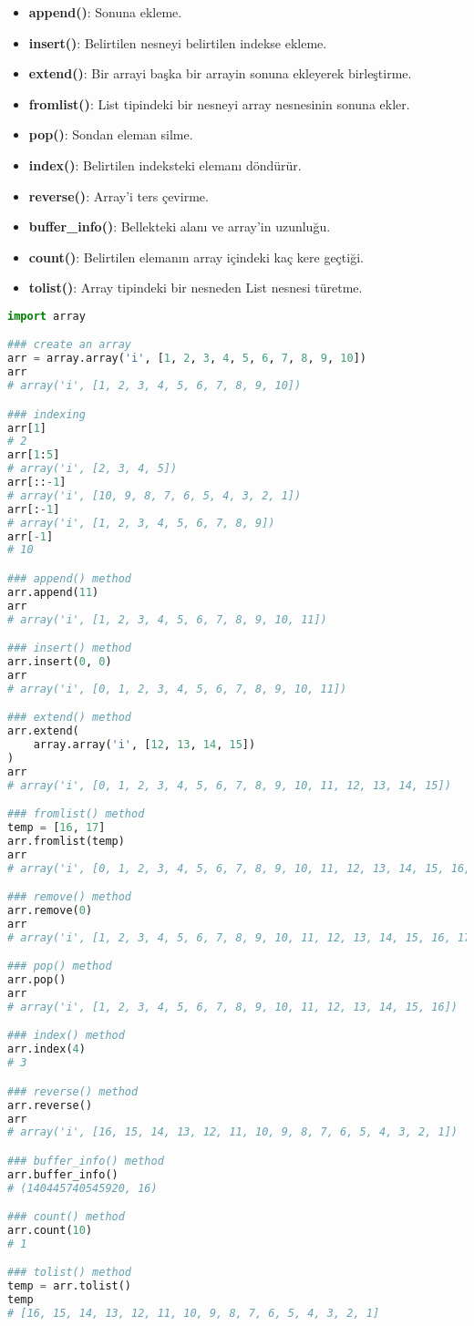 \begin{itemize}
    \item \textbf{append()}: Sonuna ekleme.
    \item \textbf{insert()}: Belirtilen nesneyi belirtilen indekse ekleme.
    \item \textbf{extend()}: Bir arrayi başka bir arrayin sonuna ekleyerek birleştirme.
    \item \textbf{fromlist()}: List tipindeki bir nesneyi array nesnesinin sonuna ekler.
    \item \textbf{pop()}: Sondan eleman silme.
    \item \textbf{index()}: Belirtilen indeksteki elemanı döndürür.
    \item \textbf{reverse()}: Array'i ters çevirme.
    \item \textbf{buffer\_info()}: Bellekteki alanı ve array'in uzunluğu.
    \item \textbf{count()}: Belirtilen elemanın array içindeki kaç kere geçtiği.
    \item \textbf{tolist()}: Array tipindeki bir nesneden List nesnesi türetme.
\end{itemize}

\begin{lstlisting}[language=Python]
import array

### create an array
arr = array.array('i', [1, 2, 3, 4, 5, 6, 7, 8, 9, 10])
arr
# array('i', [1, 2, 3, 4, 5, 6, 7, 8, 9, 10])

### indexing
arr[1]
# 2
arr[1:5]
# array('i', [2, 3, 4, 5])
arr[::-1]
# array('i', [10, 9, 8, 7, 6, 5, 4, 3, 2, 1])
arr[:-1]
# array('i', [1, 2, 3, 4, 5, 6, 7, 8, 9])
arr[-1]
# 10

### append() method
arr.append(11)
arr
# array('i', [1, 2, 3, 4, 5, 6, 7, 8, 9, 10, 11])

### insert() method
arr.insert(0, 0)
arr
# array('i', [0, 1, 2, 3, 4, 5, 6, 7, 8, 9, 10, 11])

### extend() method
arr.extend(
    array.array('i', [12, 13, 14, 15])
)
arr
# array('i', [0, 1, 2, 3, 4, 5, 6, 7, 8, 9, 10, 11, 12, 13, 14, 15])

### fromlist() method
temp = [16, 17]
arr.fromlist(temp)
arr
# array('i', [0, 1, 2, 3, 4, 5, 6, 7, 8, 9, 10, 11, 12, 13, 14, 15, 16, 17])

### remove() method
arr.remove(0)
arr
# array('i', [1, 2, 3, 4, 5, 6, 7, 8, 9, 10, 11, 12, 13, 14, 15, 16, 17])

### pop() method
arr.pop()
arr
# array('i', [1, 2, 3, 4, 5, 6, 7, 8, 9, 10, 11, 12, 13, 14, 15, 16])

### index() method
arr.index(4)
# 3

### reverse() method
arr.reverse()
arr
# array('i', [16, 15, 14, 13, 12, 11, 10, 9, 8, 7, 6, 5, 4, 3, 2, 1])

### buffer_info() method
arr.buffer_info()
# (140445740545920, 16)

### count() method
arr.count(10)
# 1

### tolist() method
temp = arr.tolist()
temp
# [16, 15, 14, 13, 12, 11, 10, 9, 8, 7, 6, 5, 4, 3, 2, 1]
\end{lstlisting}

\newpage